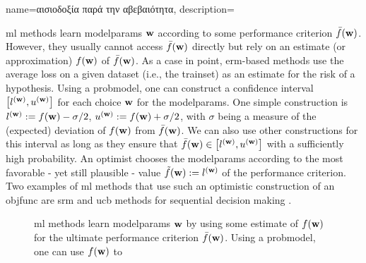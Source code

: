 {name={\foreignlanguage{greek}{αισιοδοξία παρά την αβεβαιότητα}},
	description={\gls{ml} methods learn \gls{modelparams} ${\bf w}$ 
		according to some performance criterion $\bar{f}({\bf w})$. However, they usually 
		cannot access $\bar{f}({\bf w})$ directly but rely on an estimate (or approximation) 
		$f({\bf w})$ of $\bar{f}({\bf w})$. As a case in point, \gls{erm}-based methods use 
		the average \gls{loss} on a given \gls{dataset} (i.e., the \gls{trainset}) as an estimate 
		for the \gls{risk} of a \gls{hypothesis}. Using a \gls{probmodel}, one can construct 
		a confidence interval 
	$\big[ l^{({\bf w})},  u^{({\bf w})} \big]$ for each choice ${\bf w}$ for the \gls{modelparams}.
		One simple construction is $l^{({\bf w})} := f({\bf w}) - \sigma/2$, $u^{({\bf w})} := f({\bf w})+ \sigma/2$, 
	    with $\sigma$ being a measure of the (expected) deviation of $f({\bf w})$ from $\bar{f}({\bf w})$.
	We can also use other constructions for this interval as long as they ensure that $\bar{f}({\bf w}) \in\big[ l^{({\bf w})},  u^{({\bf w})} \big]$ 
	with a sufficiently high \gls{probability}. An optimist chooses the \gls{modelparams} 
	according to the most favorable - yet still plausible - value $\tilde{f}({\bf w}) :=  l^{({\bf w})}$ 
	of the performance criterion. Two examples of \gls{ml} methods that use such an optimistic 
	construction of an \gls{objfunc} are \gls{srm} \cite[Ch. 11]{ShalevMLBook} and \gls{ucb} methods 
	for sequential decision making \cite[Sec. 2.2]{Bubeck2012}. 
		\begin{figure}[H]
				\begin{center}
\caption{\gls{ml} methods learn \gls{modelparams} ${\bf w}$ by using some estimate of $f({\bf w})$ for 
	the ultimate performance criterion $\bar{f}({\bf w})$. Using a \gls{probmodel}, one can use $f({\bf w})$ to 
}
\end{center}
\end{figure}}}
